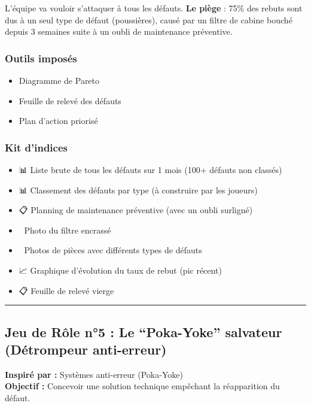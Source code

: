 \documentclass[
]{article}
\providecommand{\tightlist}{%
  \setlength{\itemsep}{0pt}\setlength{\parskip}{0pt}}
\begin{document}
L'équipe va vouloir s'attaquer à tous les défauts. \textbf{Le piège} :
75\% des rebuts sont dus à un seul type de défaut (poussières), causé
par un filtre de cabine bouché depuis 3 semaines suite à un oubli de
maintenance préventive.

\subsubsection{Outils imposés}\label{outils-imposuxe9s-3}

\begin{itemize}
\tightlist
\item
  Diagramme de Pareto
\item
  Feuille de relevé des défauts
\item
  Plan d'action priorisé
\end{itemize}

\subsubsection{Kit d'indices}\label{kit-dindices-3}

\begin{itemize}
\tightlist
\item
  📊 Liste brute de tous les défauts sur 1 mois (100+ défauts non
  classés)
\item
  📊 Classement des défauts par type (à construire par les joueurs)
\item
  📋 Planning de maintenance préventive (avec un oubli surligné)
\item
  📸 Photo du filtre encrassé
\item
  🔬 Photos de pièces avec différents types de défauts
\item
  📈 Graphique d'évolution du taux de rebut (pic récent)
\item
  📋 Feuille de relevé vierge
\end{itemize}

\begin{center}\rule{0.5\linewidth}{0.5pt}\end{center}

\subsection{Jeu de Rôle n°5 : Le ``Poka-Yoke'' salvateur (Détrompeur
anti-erreur)}\label{jeu-de-ruxf4le-n5-le-poka-yoke-salvateur-duxe9trompeur-anti-erreur}

\textbf{Inspiré par :} Systèmes anti-erreur (Poka-Yoke)\\
\textbf{Objectif :} Concevoir une solution technique empêchant la
réapparition du défaut.
\end{document}
